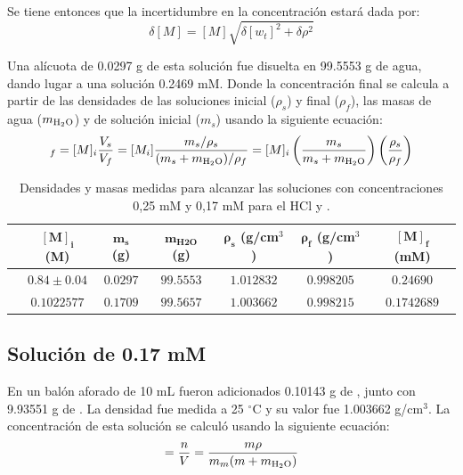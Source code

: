 		Se tiene entonces que la incertidumbre en la concentraci\'on estar\'a dada por:
		\begin{equation}
			\delta [M] = [M]\sqrt{\delta[w_t]^2 + \delta\rho^2} 
		\end{equation}
		
		Una al\'icuota de 0.0297 g de esta soluci\'on fue disuelta en 99.5553 g de agua, dando lugar a una soluci\'on 0.2469 mM. Donde la concentraci\'on final se calcula a partir de las densidades de las soluciones inicial ($\rho_s$) y final ($\rho_f$), las masas de agua ($m_\text{\ce{H2O}}$) y de soluci\'on inicial ($m_s$) usando la siguiente ecuaci\'on:
		\begin{equation}
			[M]_f = [M]_i\dfrac{V_s}{V_f} = [M_i]\dfrac{m_s/\rho_s}{(m_s + m_{\text{\ce{H2O}}})/\rho_f} =  [M]_i\left(\dfrac{m_s}{m_s + m_{\text{\ce{H2O}}}}\right)\left(\dfrac{\rho_s}{\rho_f}\right)
		\end{equation}
		
		\begin{table}[h]
			\centering
			\begin{tabular}{c|cccccc}
				& $\mathbf{[M]_i}$ (M) & $\mathbf{m_s}$ (g) & $\mathbf{m_{\text{H2O}}}$ (g) & $\mathbf{\rho_s}$ (g/cm$^3$)& $\mathbf{\rho_f}$ (g/cm$^3$) & $\mathbf{[M]_f}$ (mM) \\
				\hline
				\textbf{\ce{HCl}} & $0.84 \pm 0.04$ & $0.0297$ & $99.5553$ & $1.012832$ & $0.998205$ & $0.24690$ \\
				\textbf{\ce{KHCO3}} & $0.1022577$ & $0.1709$ & $99.5657$ & $1.003662$ & $0.998215$ & $0.1742689$ \\
				\hline
			\end{tabular}
			\caption{Densidades y masas medidas para alcanzar las soluciones con concentraciones 0,25 mM y 0,17 mM para el HCl y .}
		\end{table}
		
	\subsection{Soluci\'on de  0.17 mM}
	En un bal\'on aforado de 10 mL fueron adicionados 0.10143 g de , junto con 9.93551 g de . La densidad fue medida a 25 $^\circ$C y su valor fue 1.003662 g/cm$^3$. La concentraci\'on de esta soluci\'on se calcul\'o usando la siguiente ecuaci\'on:
	\begin{equation}
		[M] = \dfrac{n}{V} = \dfrac{m\rho}{m_m(m + m_{\ce{H2O}})}
	\end{equation}

